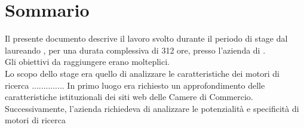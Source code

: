 
\cleardoublepage
{}
{}
\begingroup
\let\clearpage\relax
\let\cleardoublepage\relax
\let\cleardoublepage\relax

\chapter*{Sommario}

Il presente documento descrive il lavoro svolto durante il periodo di stage dal laureando \autore, per una durata complessiva di 312 ore, presso l'azienda \nomeAzienda di \locazioneAzienda. \\
Gli obiettivi da raggiungere erano molteplici. \\
Lo scopo dello stage era quello di analizzare le caratteristiche dei motori di ricerca ..............
In primo luogo era richiesto un approfondimento delle caratteristiche istituzionali dei siti web delle Camere di Commercio. \\
Successivamente, l'azienda richiedeva di analizzare le potenzialità e specificità di motori di ricerca


\endgroup

\vfill